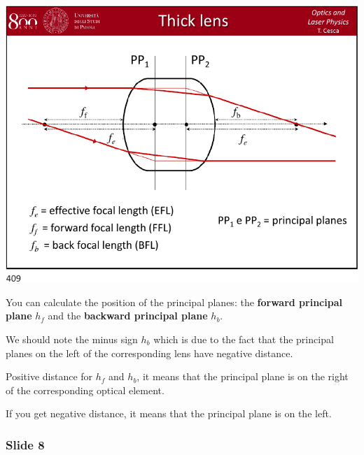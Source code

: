 \documentclass[../main/main.tex]{subfiles}
\begin{document}
\begin{minipage}[]{0.5\linewidth}
\centering
\includegraphics[page=7,width=1\textwidth]{../lessons/pdf_file/20_lecture.pdf}
\end{minipage}
\hspace{0.3cm}\vspace{0.3cm}
\begin{minipage}[c]{0.47\linewidth}

You can calculate the position of the principal planes: the \textbf{forward principal plane} \( h_f \) and the \textbf{backward principal plane} \( h_b \).

We should note the minus sign \( h_b \) which is due to the fact that the principal planes on the left of the corresponding lens have negative distance.

Positive distance for \( h_f \) and \( h_b \), it means that the principal plane is on the right of the corresponding optical element.

If you get negative distance, it means that the principal plane is on the left.

\end{minipage}

\subsubsection*{Slide 8}
\end{document}
